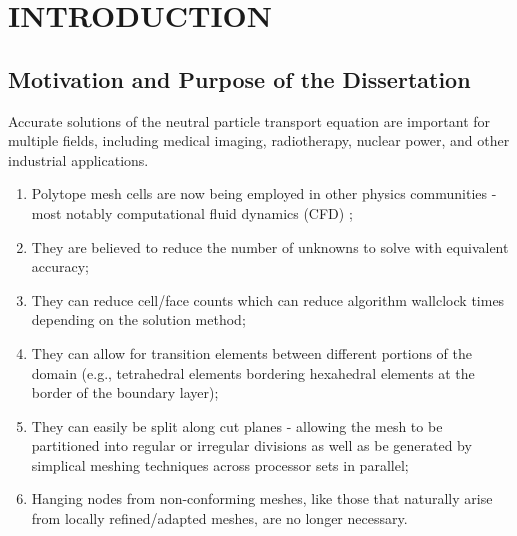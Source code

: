 %
%
%
\chapter{\uppercase {Introduction}}
\label{sec::Intro}

\section{Motivation and Purpose of the Dissertation}
\label{sec::Intro_Purpose}

Accurate solutions of the neutral particle transport equation are important for multiple fields, including medical imaging, radiotherapy, nuclear power, and other industrial applications.

\begin{enumerate}
	\item Polytope mesh cells are now being employed in other physics communities - most notably computational fluid dynamics (CFD) \cite{ref::star_CCM};
	\item They are believed to reduce the number of unknowns to solve with equivalent accuracy;
	\item They can reduce cell/face counts which can reduce algorithm wallclock times depending on the solution method;
	\item They can allow for transition elements between different portions of the domain (e.g., tetrahedral elements bordering hexahedral elements at the border of the boundary layer);
	\item They can easily be split along cut planes - allowing the mesh to be partitioned into regular or irregular divisions as well as be generated by simplical meshing techniques across processor sets in parallel;
	\item Hanging nodes from non-conforming meshes, like those that naturally arise from locally refined/adapted meshes, are no longer necessary. 
\end{enumerate}



